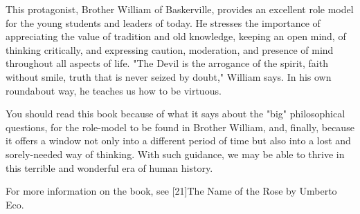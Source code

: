    This protagonist, Brother William of Baskerville, provides an excellent
   role model for the young students and leaders of today. He stresses the
   importance of appreciating the value of tradition and old knowledge,
   keeping an open mind, of thinking critically, and expressing caution,
   moderation, and presence of mind throughout all aspects of life. "The
   Devil is the arrogance of the spirit, faith without smile, truth that
   is never seized by doubt," William says. In his own roundabout way, he
   teaches us how to be virtuous.

   You should read this book because of what it says about the "big"
   philosophical questions, for the role-model to be found in Brother
   William, and, finally, because it offers a window not only into a
   different period of time but also into a lost and sorely-needed way of
   thinking. With such guidance, we may be able to thrive in this terrible
   and wonderful era of human history.

   For more information on the book, see [21]The Name of the Rose by
   Umberto Eco.

